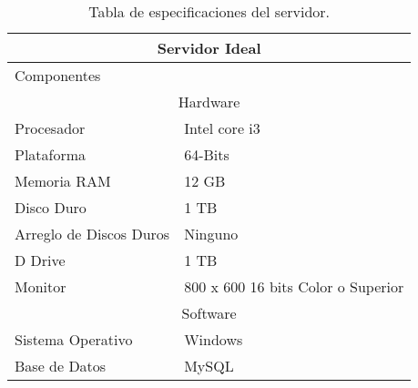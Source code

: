 	\begin{table}[htbp]
		\begin{center}
			\begin{tabular}{|l|l|}
				\hline
				\multicolumn{2}{|c|}{Servidor Ideal} \\
				\hline
				Componentes \\
				\hline
				\multicolumn{2}{|c|}{Hardware} \\
				\hline
				Procesador & Intel core i3\\
				\hline
				Plataforma & 64-Bits\\
				\hline
				Memoria RAM & 12 GB\\
				\hline
				Disco Duro & 1 TB\\
				\hline
				Arreglo de Discos Duros & Ninguno\\
				\hline
				D Drive & 1 TB\\
				\hline
				Monitor & 800 x 600 16 bits Color o Superior\\
				\hline
				\multicolumn{2}{|c|}{Software} \\
				\hline
				Sistema Operativo & Windows\\
				\hline
				Base de Datos & MySQL\\
				\hline 
			\end{tabular}
			\caption{Tabla de especificaciones del servidor.}
		\end{center}
	\end{table}